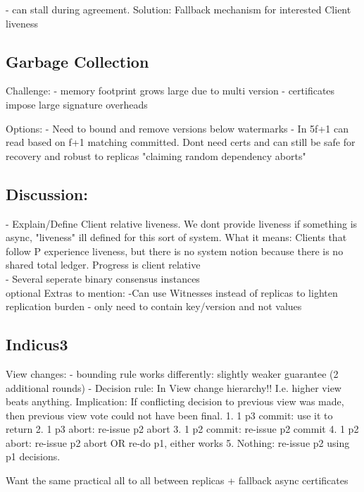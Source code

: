 - can stall during agreement. Solution: Fallback mechanism for interested Client liveness


\subsection{Garbage Collection}
Challenge:
- memory footprint grows large due to multi version
- certificates impose large signature overheads

Options:
- Need to bound and remove versions below watermarks
- In 5f+1 can read based on f+1 matching committed. Dont need certs and can still be safe for recovery and robust to replicas "claiming random dependency aborts"


\subsection{Discussion: }
- Explain/Define Client relative liveness. We dont provide liveness if something is async, "liveness" ill defined for this sort of system. What it means: Clients that follow P experience liveness, but there is no system notion because there is no shared total ledger.  Progress is client relative\\
- Several seperate binary consensus instances \\


optional Extras to mention:
-Can use Witnesses instead of replicas to lighten replication burden
- only need to contain key/version and not values


\subsection{Indicus3}



View changes:
- bounding rule works differently: slightly weaker guarantee (2 additional rounds)
- Decision rule: In View change hierarchy!! I.e. higher view beats anything. Implication: If conflicting decision to previous view was made, then previous view vote could not have been final.
	1. 1 p3 commit: use it to return
	2. 1 p3 abort: re-issue p2 abort 
	3. 1 p2 commit: re-issue p2 commit
	4. 1 p2 abort: re-issue p2 abort OR re-do p1, either works
	5. Nothing: re-issue p2 using p1 decisions.
	
Want the same practical all to all between replicas + fallback async certificates 
